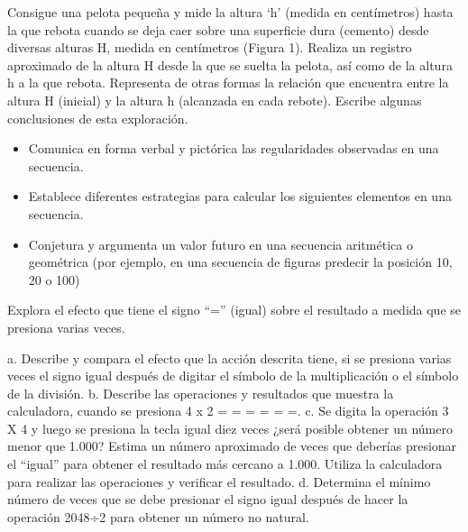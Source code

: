 \ejemplo

Consigue una pelota pequeña y mide la altura ‘h’ (medida en centímetros) hasta la que rebota cuando se deja caer sobre una superficie dura (cemento) desde diversas alturas H, medida en centímetros (Figura 1). Realiza un registro aproximado de la altura H desde la que se suelta la pelota, así como de la altura h a la que rebota. Representa de otras formas la relación que encuentra entre la altura H (inicial) y la altura h (alcanzada en cada rebote). Escribe algunas conclusiones de esta exploración.





\evidencias

\begin{itemize}
  \item Comunica en forma verbal y pictórica las regularidades observadas en una secuencia.
  \item Establece diferentes estrategias para calcular los siguientes elementos en una secuencia.
  \item Conjetura y argumenta un valor futuro en una secuencia aritmética o geométrica (por ejemplo, en una secuencia de figuras predecir la posición 10, 20 o 100)
\end{itemize}

\ejemplo

Explora el efecto que tiene el signo “=” (igual) sobre el resultado a medida que se presiona varias veces.


a. Describe y compara el efecto que la acción descrita tiene, si se presiona varias veces el signo igual después de digitar el símbolo de la multiplicación o el símbolo de la división. b. Describe las operaciones y resultados que muestra la calculadora, cuando se presiona 4 x 2 = = = = = =. c. Se digita la operación 3 X 4 y luego se presiona la tecla igual diez veces ¿será posible obtener un número menor que 1.000? Estima un número aproximado de veces que deberías presionar el “igual” para obtener el resultado más cercano a 1.000. Utiliza la calculadora para realizar las operaciones y verificar el resultado. d. Determina el mínimo número de veces que se debe presionar el signo igual después de hacer la operación 2048÷2 para obtener un número no natural.


